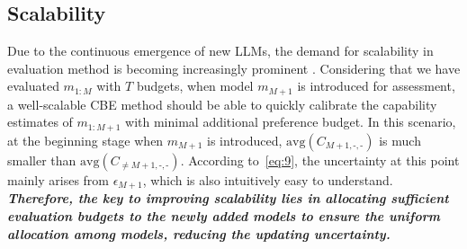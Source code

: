 \subsection{Scalability}
\label{sec:3.4}
Due to the continuous emergence of new LLMs, the demand for scalability in evaluation method is becoming increasingly prominent \citep{scalable}. 
Considering that we have evaluated $m_{1:M}$ with $T$ budgets, when model $m_{M+1}$ is introduced for assessment, a well-scalable CBE method should be able to quickly calibrate the capability estimates of $m_{1:M+1}$ with minimal additional preference budget. 
In this scenario, at the beginning stage when \( m_{M+1} \) is introduced, $\mathrm{avg}(C_{M+1,\text{-},\text{-}})$ is much smaller than $\mathrm{avg}(C_{\neq M+1,\text{-},\text{-}})$. 
According to~\eqref{eq:9}, the uncertainty at this point mainly arises from $\epsilon_{M+1}$, which is also intuitively easy to understand.
\textit{\textbf{Therefore, the key to improving scalability lies in allocating sufficient evaluation budgets to the newly added models to ensure
the uniform allocation among models, reducing the updating uncertainty.}}
% 


